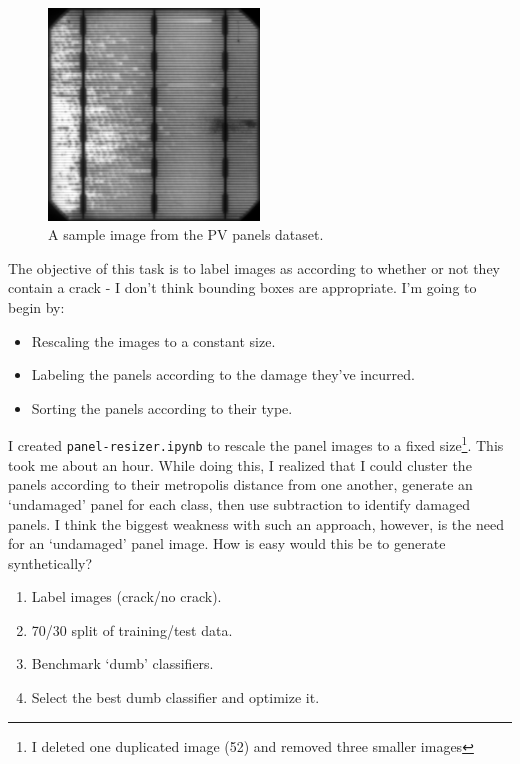 \documentclass[idxtotoc,hyperref,openany]{labbook} %
\begin{document}
\begin{figure}
\centering
\includegraphics[width=0.5\textwidth]{pv_cell.png}
\caption{A sample image from the PV panels dataset.}
\label{fig:example_pv_cell}
\end{figure}

The objective of this task is to label images as according to whether or not they contain a crack - I don't think bounding boxes are appropriate. I'm going to begin by:
\begin{itemize}
	\item Rescaling the images to a constant size.
	\item Labeling the panels according to the damage they've incurred.
	\item Sorting the panels according to their type.
\end{itemize}

I created \texttt{panel-resizer.ipynb} to rescale the panel images to a fixed size\footnote{I deleted one duplicated image (52) and removed three smaller images}. This took me about an hour. While doing this, I realized that I could cluster the panels according to their metropolis distance from one another, generate an `undamaged' panel for each class, then use subtraction to identify damaged panels. I think the biggest weakness with such an approach, however, is the need for an `undamaged' panel image. How is easy would this be to generate synthetically?
\begin{enumerate}
	\item Label images (crack/no crack).
	\item 70/30 split of training/test data.
	\item Benchmark `dumb' classifiers.
	\item Select the best dumb classifier and optimize it.
\end{enumerate}
\end{document}
